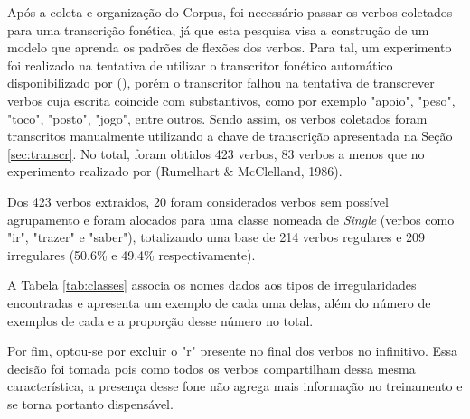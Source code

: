 Após a coleta e organização do Corpus, foi necessário passar os verbos coletados para uma transcrição fonética, já que esta pesquisa visa a construção de um modelo que aprenda os padrões de flexões dos verbos. Para tal, um experimento foi realizado na tentativa de utilizar o transcritor fonético automático disponibilizado por (\cite{guide:2016}), porém o transcritor falhou na tentativa de transcrever verbos cuja escrita coincide com substantivos, como por exemplo "apoio", "peso", "toco", "posto", "jogo", entre outros. Sendo assim, os verbos coletados foram transcritos manualmente utilizando a chave de transcrição apresentada na Seção \ref{sec:transcr}. No total, foram obtidos 423 verbos, 83 verbos a menos que no experimento realizado por (Rumelhart \& McClelland, 1986)\cite{rumelhart:1986}.

Dos 423 verbos extraídos, 20 foram considerados verbos sem possível agrupamento e foram alocados para uma classe nomeada de \textit{Single} (verbos como "ir", "trazer" e "saber"), totalizando uma base de 214 verbos regulares e 209 irregulares (50.6\% e 49.4\% respectivamente). 

A Tabela \ref{tab:classes} associa os nomes dados aos tipos de irregularidades encontradas e apresenta um exemplo de cada uma delas, além do número de exemplos de cada e a proporção desse número no total. 

Por fim, optou-se por excluir o "r" presente no final dos verbos no infinitivo. Essa decisão foi tomada pois como todos os verbos compartilham dessa mesma característica, a presença desse fone não agrega mais informação no treinamento e se torna portanto dispensável.

